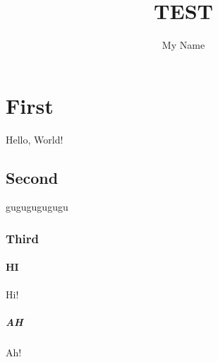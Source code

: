 \documentclass{article}
\author{My Name}
\title{TEST}
\begin{document}
    \maketitle
    \tableofcontents
    \section{First}
    Hello, World!
    \subsection{Second}
    gugugugugugu
    \subsubsection{Third}
    \paragraph{HI}
    Hi!
    \subparagraph{AH}
    Ah!
\end{document}
